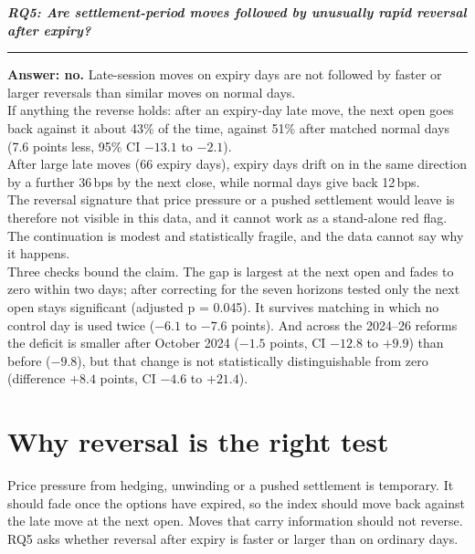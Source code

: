 \documentclass[10pt,a4paper]{article}
\newcommand{\bps}{\,bps\xspace}
\begin{document}
{\raggedright\Large\bfseries\itshape RQ5: Are settlement-period moves followed by unusually rapid reversal after expiry?\par}
\vspace{2pt}\hrule\vspace{6pt}

\textbf{Answer: no.} Late-session moves on expiry days are not followed by faster or larger reversals than similar moves on normal days.\\
If anything the reverse holds: after an expiry-day late move, the next open goes back against it about 43\% of the time, against 51\% after matched normal days (7.6 points less, 95\% CI $-13.1$ to $-2.1$).\\
After large late moves (66 expiry days), expiry days drift on in the same direction by a further 36\bps by the next close, while normal days give back 12\bps.\\
The reversal signature that price pressure or a pushed settlement would leave is therefore not visible in this data, and it cannot work as a stand-alone red flag. The continuation is modest and statistically fragile, and the data cannot say why it happens.\\
Three checks bound the claim. The gap is largest at the next open and fades to zero within two days; after correcting for the seven horizons tested only the next open stays significant (adjusted p = 0.045). It survives matching in which no control day is used twice ($-6.1$ to $-7.6$ points). And across the 2024--26 reforms the deficit is smaller after October 2024 ($-1.5$ points, CI $-12.8$ to $+9.9$) than before ($-9.8$), but that change is not statistically distinguishable from zero (difference $+8.4$ points, CI $-4.6$ to $+21.4$).

\section*{Why reversal is the right test}
Price pressure from hedging, unwinding or a pushed settlement is temporary. It should fade once the options have expired, so the index should move back against the late move at the next open. Moves that carry information should not reverse. RQ5 asks whether reversal after expiry is faster or larger than on ordinary days.
\end{document}
